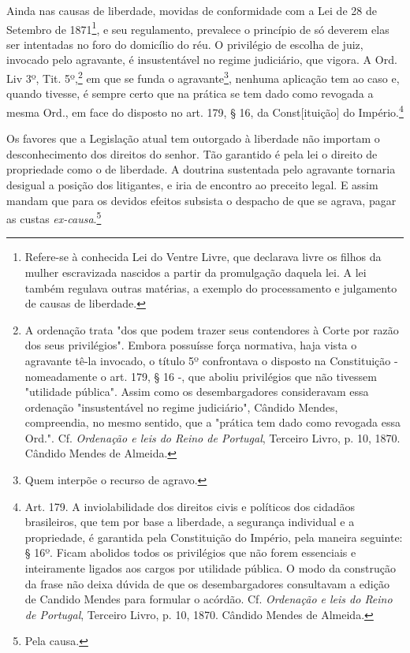Ainda nas causas de liberdade, movidas de conformidade com a Lei de 28
de Setembro de 1871\footnote{Refere-se à conhecida Lei do Ventre
  Livre, que declarava livre os filhos da mulher escravizada nascidos a
  partir da promulgação daquela lei. A lei também regulava outras
  matérias, a exemplo do processamento e julgamento de causas de
  liberdade.}, e seu regulamento, prevalece o princípio de só deverem
elas ser intentadas no foro do domicílio do réu. O privilégio de escolha
de juiz, invocado pelo agravante, é insustentável no regime judiciário,
que vigora. A Ord. Liv 3º, Tit. 5º,\footnote{A ordenação trata "dos
  que podem trazer seus contendores à Corte por razão dos seus
  privilégios". Embora possuísse força normativa, haja vista o agravante
  tê-la invocado, o título 5º confrontava o disposto na Constituição -
  nomeadamente o art. 179, § 16 -, que aboliu privilégios que não
  tivessem "utilidade pública". Assim como os desembargadores
  consideravam essa ordenação "insustentável no regime judiciário",
  Cândido Mendes, compreendia, no mesmo sentido, que a "prática tem dado
  como revogada essa Ord.". Cf. \emph{Ordenação e leis do Reino de
  Portugal}, Terceiro Livro, p. 10, 1870. Cândido Mendes de Almeida.} em
que se funda o agravante\footnote{Quem interpõe o recurso de agravo.},
nenhuma aplicação tem ao caso e, quando tivesse, é sempre certo que na
prática se tem dado como revogada a mesma Ord., em face do disposto no
art. 179, § 16, da Const{[}ituição{]} do Império.\footnote{Art. 179. A
  inviolabilidade dos direitos civis e políticos dos cidadãos
  brasileiros, que tem por base a liberdade, a segurança individual e a
  propriedade, é garantida pela Constituição do Império, pela maneira
  seguinte: § 16º. Ficam abolidos todos os privilégios que não forem
  essenciais e inteiramente ligados aos cargos por utilidade pública. O
  modo da construção da frase não deixa dúvida de que os desembargadores
  consultavam a edição de Candido Mendes para formular o acórdão. Cf.
  \emph{Ordenação e leis do Reino de Portugal}, Terceiro Livro, p. 10,
  1870. Cândido Mendes de Almeida.}

Os favores que a Legislação atual tem outorgado à liberdade não importam
o desconhecimento dos direitos do senhor. Tão garantido é pela lei o
direito de propriedade como o de liberdade. A doutrina sustentada pelo
agravante tornaria desigual a posição dos litigantes, e iria de encontro
ao preceito legal. E assim mandam que para os devidos efeitos subsista o
despacho de que se agrava, pagar as custas \emph{ex-causa}.\footnote{
  Pela causa.}

